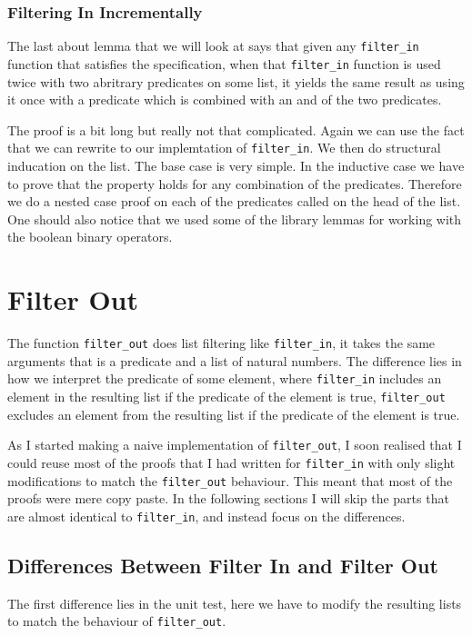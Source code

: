 \documentclass{article}
\begin{document}
\subsubsection{Filtering In Incrementally}
The last about lemma that we will look at says that given any \texttt{filter\_in} function that satisfies the specification, when that \texttt{filter\_in} function is used twice with two abritrary predicates on some list, it yields the same result as using it once with a predicate which is combined with an and of the two predicates.

The proof is a bit long but really not that complicated. Again we can use the fact that we can rewrite to our implemtation of \texttt{filter\_in}. We then do structural inducation on the list. The base case is very simple. In the inductive case we have to prove that the property holds for any combination of the predicates. Therefore we do a nested case proof on each of the predicates called on the head of the list. One should also notice that we used some of the library lemmas for working with the boolean binary operators.

\section{Filter Out}
The function \texttt{filter\_out} does list filtering like \texttt{filter\_in}, it takes the same arguments that is a predicate and a list of natural numbers. The difference lies in how we interpret the predicate of some element, where \texttt{filter\_in} includes an element in the resulting list if the predicate of the element is true, \texttt{filter\_out} excludes an element from the resulting list if the predicate of the element is true.

As I started making a naive implementation of \texttt{filter\_out}, I soon realised that I could reuse most of the proofs that I had written for \texttt{filter\_in} with only slight modifications to match the \texttt{filter\_out} behaviour. This meant that most of the proofs were mere copy paste. In the following sections I will skip the parts that are almost identical to \texttt{filter\_in}, and instead focus on the differences.

\subsection{Differences Between Filter In and Filter Out}
The first difference lies in the unit test, here we have to modify the resulting lists to match the behaviour of \texttt{filter\_out}.
\end{document}
